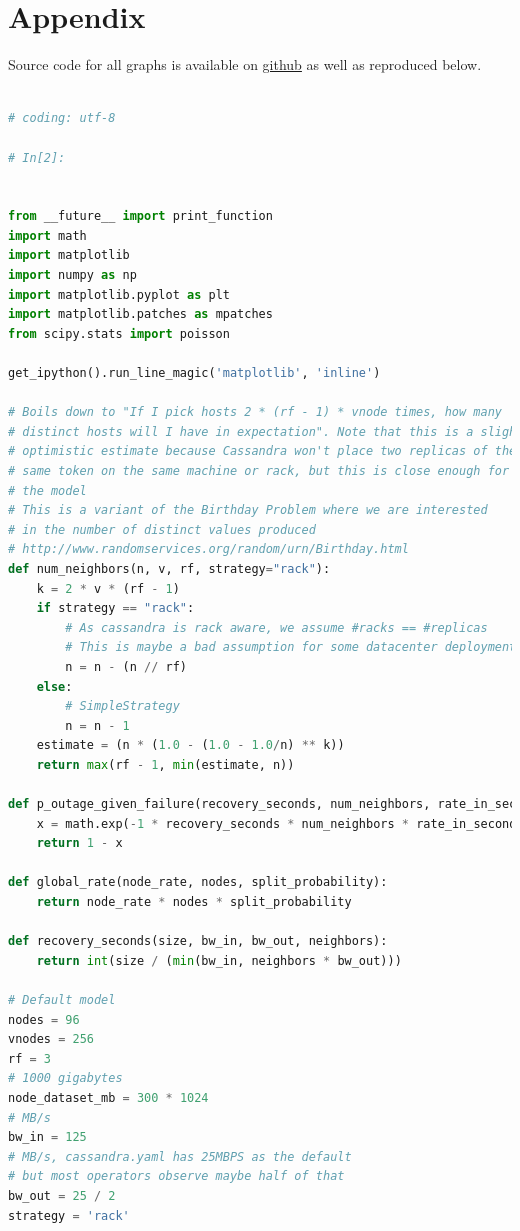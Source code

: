 \documentclass{article}
\begin{document}
\section{Appendix}

Source code for all graphs is available on \href{https://github.com/jolynch/python_performance_toolkit/blob/master/notebooks/cassandra_availability/cassandra_availability.ipynb}{github} as well as reproduced below.
\begin{lstlisting}[language=Python]

# coding: utf-8

# In[2]:


from __future__ import print_function
import math
import matplotlib
import numpy as np
import matplotlib.pyplot as plt
import matplotlib.patches as mpatches
from scipy.stats import poisson

get_ipython().run_line_magic('matplotlib', 'inline')

# Boils down to "If I pick hosts 2 * (rf - 1) * vnode times, how many
# distinct hosts will I have in expectation". Note that this is a slightly
# optimistic estimate because Cassandra won't place two replicas of the
# same token on the same machine or rack, but this is close enough for
# the model
# This is a variant of the Birthday Problem where we are interested
# in the number of distinct values produced
# http://www.randomservices.org/random/urn/Birthday.html
def num_neighbors(n, v, rf, strategy="rack"):
    k = 2 * v * (rf - 1)
    if strategy == "rack":
        # As cassandra is rack aware, we assume #racks == #replicas
        # This is maybe a bad assumption for some datacenter deployments
        n = n - (n // rf)
    else:
        # SimpleStrategy
        n = n - 1
    estimate = (n * (1.0 - (1.0 - 1.0/n) ** k))
    return max(rf - 1, min(estimate, n))

def p_outage_given_failure(recovery_seconds, num_neighbors, rate_in_seconds):
    x = math.exp(-1 * recovery_seconds * num_neighbors * rate_in_seconds)
    return 1 - x

def global_rate(node_rate, nodes, split_probability):
    return node_rate * nodes * split_probability

def recovery_seconds(size, bw_in, bw_out, neighbors):
    return int(size / (min(bw_in, neighbors * bw_out)))

# Default model
nodes = 96
vnodes = 256
rf = 3
# 1000 gigabytes
node_dataset_mb = 300 * 1024
# MB/s
bw_in = 125
# MB/s, cassandra.yaml has 25MBPS as the default
# but most operators observe maybe half of that
bw_out = 25 / 2
strategy = 'rack'


\end{lstlisting}
\end{document}
